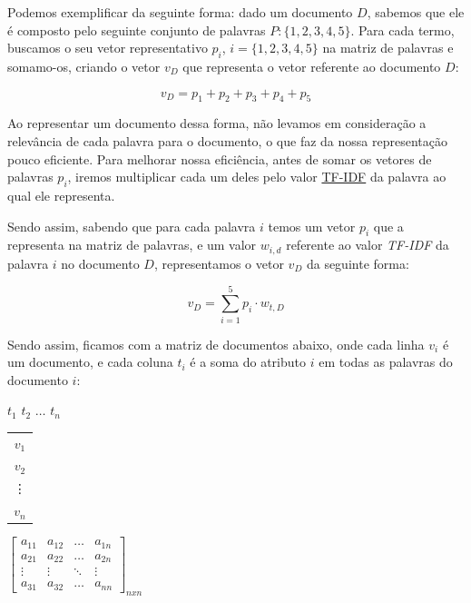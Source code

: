 \documentclass[a4paper,12pt]{article}
\begin{document}
Podemos exemplificar da seguinte forma: dado um documento $D$, sabemos que ele é composto pelo seguinte conjunto de palavras
$P:\{1,2,3,4,5\}$. Para cada termo, buscamos o seu vetor representativo $p_{i}$, $i =\{1,2,3,4,5\}$ na matriz de
palavras e somamo-os, criando o vetor $v_{D}$ que representa o vetor referente ao documento $D$:

\begin{equation}
  v_{D} = p_{1}+p_{2}+p_{3}+p_{4}+p_{5}
\end{equation}


Ao representar um documento dessa forma, não levamos em consideração a relevância de cada palavra para o documento, o que
faz da nossa representação pouco eficiente. Para melhorar nossa 
eficiência, antes de somar os vetores de palavras $p_{i}$, iremos multiplicar cada um deles pelo valor \hyperref[sec:nlp]{TF-IDF} da palavra
ao qual ele representa.

Sendo assim, sabendo que para cada palavra $i$ temos um vetor $p_{i}$ que a representa na matriz de palavras, e um valor $w_{i,d}$ referente
ao valor \textit{TF-IDF} da palavra $i$ no documento $D$, representamos o vetor $v_{D}$ da seguinte forma:

\begin{equation}
  v_{D} = \sum_{i=1}^{5} p_{i} \cdot w_{t,D}
\end{equation}


Sendo assim, ficamos com a matriz de documentos abaixo, onde cada linha $v_{i}$ é um documento, e cada coluna $t_{i}$ é a soma do atributo $i$
em todas as palavras do documento $i$:

 \begin{center}
 \hspace{0.2cm}$t_{1}$ \hspace{0.5cm} $t_{2}$ \hspace{0.3cm} $\hdots$ \hspace{0.4cm}$t_{n}$
 
 \vspace{0.2cm}
 
\begin{tabular}{c}
   $v_{1}$ \\
   $v_{2}$ \\
   \vdots\\
   $v_{n}$
 \end{tabular}
 $
 \begin{bmatrix}
  a_{11} & a_{12} & \hdots & a_{1n}\\
  a_{21} & a_{22} & \hdots & a_{2n}\\
  \vdots & \vdots & \ddots & \vdots\\
  a_{31} & a_{32} & \hdots & a_{nn}
 \end{bmatrix}_{nxn}
$

\end{center}
\end{document}

